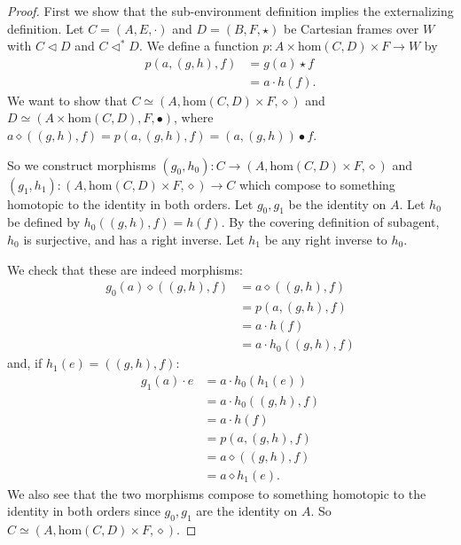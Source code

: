 \documentclass{article}
\begin{document}
\begin{proof}
First we show that the sub-environment definition implies the externalizing definition.
Let $C = (A, E, \cdot)$ and $D = (B, F, \star)$ be Cartesian frames over $W$ with $C \triangleleft D$ and $C \triangleleft^* D$.
We define a function $p: A \times \text{hom}(C, D) \times F \to W$ by
\[
\begin{split}
    p(a, (g, h), f) & = g(a) \star f \\
                    & = a \cdot h(f).
\end{split}
\]
We want to show that $C \simeq (A, \text{hom}(C, D) \times F, \diamond)$ and $D \simeq (A \times \text{hom}(C, D), F, \bullet)$, where $a \diamond ((g, h), f) = p(a, (g, h), f) = (a, (g, h)) \bullet f$.

So we construct morphisms $(g_0, h_0) : C \to (A, \text{hom}(C, D) \times F, \diamond)$ and $(g_1, h_1) : (A, \text{hom}(C, D) \times F, \diamond) \to C$ which compose to something homotopic to the identity in both orders.
Let $g_0, g_1$ be the identity on $A$.
Let $h_0$ be defined by $h_0((g, h), f) = h(f)$.
By the covering definition of subagent, $h_0$ is surjective, and has a right inverse.
Let $h_1$ be any right inverse to $h_0$.

We check that these are indeed morphisms:
\[
\begin{split}
    g_0(a) \diamond ((g, h), f) & = a \diamond ((g, h), f) \\
                                & = p(a, (g, h), f) \\
                                & = a \cdot h(f) \\
                                & = a \cdot h_0((g, h), f)
\end{split}
\]
and, if $h_1(e) = ((g, h), f)$: 
\[
\begin{split}
    g_1(a) \cdot e & = a \cdot h_0(h_1(e)) \\
                   & = a \cdot h_0((g, h), f) \\
                   & = a \cdot h(f) \\
                   & = p(a, (g, h), f) \\
                   & = a \diamond ((g, h), f) \\
                   & = a \diamond h_1(e).
\end{split}
\]
We also see that the two morphisms compose to something homotopic to the identity in both orders since $g_0, g_1$ are the identity on $A$.
So $C \simeq (A, \text{hom}(C, D) \times F, \diamond)$.


\end{proof}
\end{document}
